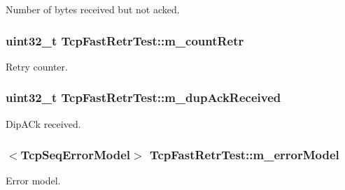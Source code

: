 Number of bytes received but not acked. 

\subsubsection[{\texorpdfstring{m\+\_\+count\+Retr}{m_countRetr}}]{\setlength{\rightskip}{0pt plus 5cm}uint32\+\_\+t Tcp\+Fast\+Retr\+Test\+::m\+\_\+count\+Retr\hspace{0.3cm}{\ttfamily [protected]}}\hypertarget{classTcpFastRetrTest_a8b7da51cca3cf7f9113f81de4b0ec680}{}\label{classTcpFastRetrTest_a8b7da51cca3cf7f9113f81de4b0ec680}


Retry counter. 

\subsubsection[{\texorpdfstring{m\+\_\+dup\+Ack\+Received}{m_dupAckReceived}}]{\setlength{\rightskip}{0pt plus 5cm}uint32\+\_\+t Tcp\+Fast\+Retr\+Test\+::m\+\_\+dup\+Ack\+Received\hspace{0.3cm}{\ttfamily [protected]}}\hypertarget{classTcpFastRetrTest_aedcc941670077c95d80cffa2258530aa}{}\label{classTcpFastRetrTest_aedcc941670077c95d80cffa2258530aa}


Dip\+A\+Ck received. 

\subsubsection[{\texorpdfstring{m\+\_\+error\+Model}{m_errorModel}}]{$<${\bf Tcp\+Seq\+Error\+Model}$>$ Tcp\+Fast\+Retr\+Test\+::m\+\_\+error\+Model\hspace{0.3cm}{\ttfamily [protected]}}\hypertarget{classTcpFastRetrTest_a8b673b34b4afa04ffe078cf14c1dec09}{}\label{classTcpFastRetrTest_a8b673b34b4afa04ffe078cf14c1dec09}


Error model. 

